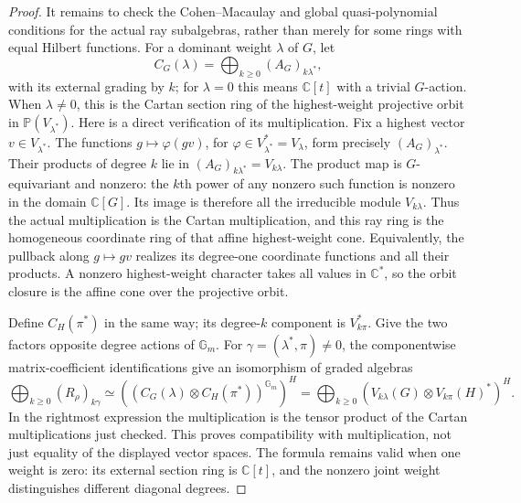 \documentclass[11pt,a4paper]{article}
\begin{document}
\begin{proof}
It remains to check the Cohen--Macaulay and global quasi-polynomial
conditions for the actual ray subalgebras, rather than merely for
some rings with equal Hilbert functions. For a dominant weight
$\lambda$ of $G$, let
\[
 C_G(\lambda)=\bigoplus_{k\ge0}(A_G)_{k\lambda^*},
\]
with its external grading by $k$; for $\lambda=0$ this means
$\mathbb C[t]$ with a trivial $G$-action. When $\lambda\ne0$,
this is the Cartan section ring of the highest-weight projective
orbit in $\mathbb P(V_{\lambda^*})$. Here is a direct verification
of its multiplication. Fix a highest vector $v\in V_{\lambda^*}$.
The functions $g\mapsto\varphi(gv)$, for
$\varphi\in V_{\lambda^*}^*=V_\lambda$, form precisely
$(A_G)_{\lambda^*}$. Their products of degree $k$ lie in
$(A_G)_{k\lambda^*}=V_{k\lambda}$. The product map is $G$-equivariant
and nonzero: the $k$th power of any nonzero such function is nonzero
in the domain $\mathbb C[G]$. Its image is therefore all the
irreducible module $V_{k\lambda}$. Thus the actual multiplication
is the Cartan multiplication, and this ray ring is the homogeneous
coordinate ring of that affine highest-weight cone. Equivalently,
the pullback along $g\mapsto gv$ realizes its degree-one coordinate
functions and all their products. A nonzero highest-weight character
takes all values in $\mathbb C^*$, so the orbit closure is the
affine cone over the projective orbit.

Define $C_H(\pi^*)$ in the same way; its degree-$k$ component is
$V_{k\pi}^*$. Give the two factors opposite degree actions of
$\mathbb G_m$. For $\gamma=(\lambda^*,\pi)\ne0$, the componentwise
matrix-coefficient identifications give an isomorphism of graded
algebras
\[
 \bigoplus_{k\ge0}(R_\rho)_{k\gamma}
 \simeq
 \left((C_G(\lambda)\otimes C_H(\pi^*))^{\mathbb G_m}\right)^H
 =\bigoplus_{k\ge0}
      (V_{k\lambda}(G)\otimes V_{k\pi}(H)^*)^H.
 \tag{P-F17e}
\]
In the rightmost expression the multiplication is the tensor product
of the Cartan multiplications just checked. This proves compatibility
with multiplication, not just equality of the displayed vector spaces.
The formula remains valid when one weight is zero: its external
section ring is $\mathbb C[t]$, and the nonzero joint weight
distinguishes different diagonal degrees.


\end{proof}
\end{document}
